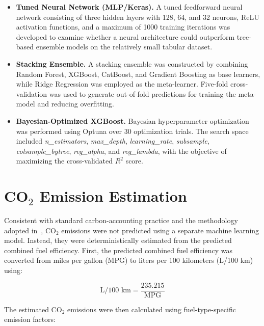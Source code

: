\begin{itemize}

\item \textbf{Tuned Neural Network (MLP/Keras).}
A tuned feedforward neural network consisting of three hidden layers with 128, 64, and 32 neurons, ReLU activation functions, and a maximum of 1000 training iterations was developed to examine whether a neural architecture could outperform tree-based ensemble models on the relatively small tabular dataset.

\item \textbf{Stacking Ensemble.}
A stacking ensemble was constructed by combining Random Forest, XGBoost, CatBoost, and Gradient Boosting as base learners, while Ridge Regression was employed as the meta-learner. Five-fold cross-validation was used to generate out-of-fold predictions for training the meta-model and reducing overfitting.

\item \textbf{Bayesian-Optimized XGBoost.}
Bayesian hyperparameter optimization was performed using Optuna over 30 optimization trials. The search space included \textit{n\_estimators}, \textit{max\_depth}, \textit{learning\_rate}, \textit{subsample}, \textit{colsample\_bytree}, \textit{reg\_alpha}, and \textit{reg\_lambda}, with the objective of maximizing the cross-validated $R^2$ score.

\end{itemize}



\section{CO$_2$ Emission Estimation}

Consistent with standard carbon-accounting practice and the methodology adopted in~\cite{atique2026explainable}, CO$_2$ emissions were not predicted using a separate machine learning model. Instead, they were deterministically estimated from the predicted combined fuel efficiency. First, the predicted combined fuel efficiency was converted from miles per gallon (MPG) to liters per 100 kilometers (L/100 km) using:

\begin{equation}
\text{L/100 km}=\frac{235.215}{\text{MPG}}
\label{eq:l100km}
\end{equation}

The estimated CO$_2$ emissions were then calculated using fuel-type-specific emission factors:


